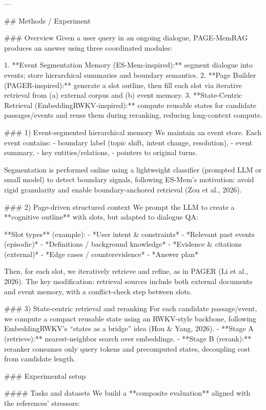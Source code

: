 ---

## Methods / Experiment  

### Overview  
Given a user query in an ongoing dialogue, PAGE-MemRAG produces an answer using three coordinated modules:

1. **Event Segmentation Memory (ES-Mem-inspired):** segment dialogue into events; store hierarchical summaries and boundary semantics.  
2. **Page Builder (PAGER-inspired):** generate a slot outline, then fill each slot via iterative retrieval from (a) external corpus and (b) event memory.  
3. **State-Centric Retrieval (EmbeddingRWKV-inspired):** compute reusable states for candidate passages/events and reuse them during reranking, reducing long-context compute.

### 1) Event-segmented hierarchical memory  
We maintain an event store. Each event contains:  
- boundary label (topic shift, intent change, resolution),  
- event summary,  
- key entities/relations,  
- pointers to original turns.

Segmentation is performed online using a lightweight classifier (prompted LLM or small model) to detect boundary signals, following ES-Mem’s motivation: avoid rigid granularity and enable boundary-anchored retrieval (Zou et al., 2026).

### 2) Page-driven structured context  
We prompt the LLM to create a **cognitive outline** with slots, but adapted to dialogue QA:

**Slot types** (example):  
- *User intent & constraints*  
- *Relevant past events (episodic)*  
- *Definitions / background knowledge*  
- *Evidence & citations (external)*  
- *Edge cases / counterevidence*  
- *Answer plan*

Then, for each slot, we iteratively retrieve and refine, as in PAGER (Li et al., 2026). The key modification: retrieval sources include both external documents and event memory, with a conflict-check step between slots.

### 3) State-centric retrieval and reranking  
For each candidate passage/event, we compute a compact reusable state using an RWKV-style backbone, following EmbeddingRWKV’s “states as a bridge” idea (Hou & Yang, 2026).  
- **Stage A (retrieve):** nearest-neighbor search over embeddings.  
- **Stage B (rerank):** reranker consumes only query tokens and precomputed states, decoupling cost from candidate length.

### Experimental setup  

#### Tasks and datasets  
We build a **composite evaluation** aligned with the references’ stressors:

